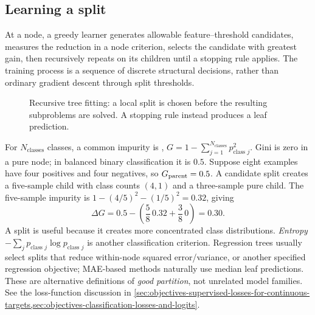 \subsection{Learning a split}
\label{subsec:trees-learning-a-split}
At a node, a greedy learner generates allowable feature--threshold candidates, measures the reduction in a node criterion, selects the candidate with greatest gain, then recursively repeats on its children until a stopping rule applies.
The training process is a sequence of discrete structural decisions, rather than ordinary gradient descent through split thresholds.

\begin{figure}[htbp]\centering
{}
\caption{Recursive tree fitting: a local split is chosen before the resulting subproblems are solved.
A stopping rule instead produces a leaf prediction.}
\label{fig:tree_fit_flow}
\end{figure}

For $N_{\text{classes}}$ classes, a common impurity is , $G=1-\sum_{j=1}^{N_{\text{classes}}}p_{\text{class }j}^{2}$.
Gini is zero in a pure node; in balanced binary classification it is $0.5$.
Suppose eight examples have four positives and four negatives, so $G_{\rm parent}=0.5$.
A candidate split creates a five-sample child with class counts $(4,1)$ and a three-sample pure child.
The five-sample impurity is $1-(4/5)^2-(1/5)^2=0.32$, giving
\begin{equation}
\boxed{\Delta G=0.5-\left(\frac58\,0.32+\frac38\,0\right)=0.30.}
\end{equation}
A split is useful because it creates more concentrated class distributions.
\emph{Entropy} $-\sum_j p_{\text{class }j}\log p_{\text{class }j}$ is another classification criterion.
Regression trees usually select splits that reduce within-node squared error/variance, or another specified regression objective; MAE-based methods naturally use median leaf predictions.
These are alternative definitions of \emph{good partition}, not unrelated model families.
See the loss-function discussion in \cref{sec:objectives-supervised-losses-for-continuous-targets,sec:objectives-classification-losses-and-logits}.

